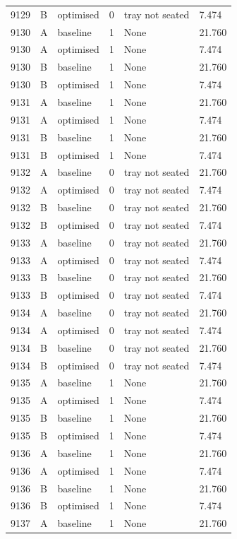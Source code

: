 \begin{longtable}{llllll}
9129 & B & optimised & 0 & tray not seated & 7.474 \\
9130 & A & baseline & 1 & None & 21.760 \\
9130 & A & optimised & 1 & None & 7.474 \\
9130 & B & baseline & 1 & None & 21.760 \\
9130 & B & optimised & 1 & None & 7.474 \\
9131 & A & baseline & 1 & None & 21.760 \\
9131 & A & optimised & 1 & None & 7.474 \\
9131 & B & baseline & 1 & None & 21.760 \\
9131 & B & optimised & 1 & None & 7.474 \\
9132 & A & baseline & 0 & tray not seated & 21.760 \\
9132 & A & optimised & 0 & tray not seated & 7.474 \\
9132 & B & baseline & 0 & tray not seated & 21.760 \\
9132 & B & optimised & 0 & tray not seated & 7.474 \\
9133 & A & baseline & 0 & tray not seated & 21.760 \\
9133 & A & optimised & 0 & tray not seated & 7.474 \\
9133 & B & baseline & 0 & tray not seated & 21.760 \\
9133 & B & optimised & 0 & tray not seated & 7.474 \\
9134 & A & baseline & 0 & tray not seated & 21.760 \\
9134 & A & optimised & 0 & tray not seated & 7.474 \\
9134 & B & baseline & 0 & tray not seated & 21.760 \\
9134 & B & optimised & 0 & tray not seated & 7.474 \\
9135 & A & baseline & 1 & None & 21.760 \\
9135 & A & optimised & 1 & None & 7.474 \\
9135 & B & baseline & 1 & None & 21.760 \\
9135 & B & optimised & 1 & None & 7.474 \\
9136 & A & baseline & 1 & None & 21.760 \\
9136 & A & optimised & 1 & None & 7.474 \\
9136 & B & baseline & 1 & None & 21.760 \\
9136 & B & optimised & 1 & None & 7.474 \\
9137 & A & baseline & 1 & None & 21.760 \\

\end{longtable}
